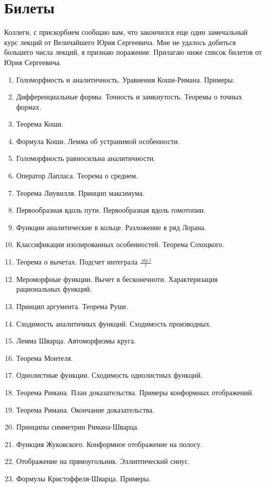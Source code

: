 \documentclass[12pt,a4paper]{article} %
\begin{document}
	\section{Билеты}
	Коллеги, с прискорбием сообщаю вам, что закончился еще один замечальный курс лекций от Величайшего Юрия Сергеевича. Мне не удалось добиться большего числа лекций, я признаю поражение. Прилагаю ниже список билетов от Юрия Сергеевича.
	\begin{enumerate}
		\item Голоморфность и аналитичность. Уравнения Коши-Римана. Примеры.
		\item Дифференциальные формы. Точность и замкнутость. Теоремы о точных формах.
		\item Теорема Коши.
		\item Формула Коши. Лемма об устранимой особенности.
		\item Голоморфность равносильна аналитичности.
		\item Оператор Лапласа. Теорема о среднем.
		\item Теорема Лиувилля. Принцип максимума.
		\item Первообразная вдоль пути. Первообразная вдоль гомотопии.
		\item Функции аналитические в кольце. Разложение в ряд Лорана.
		\item Классификация изолированных особенностей. Теорема Сохоцкого.
		\item Теорема о вычетах. Подсчет интеграла $\frac{\sin t}{t}$
		\item Мероморфные функции. Вычет в бесконечноти. Характеризация рациональных функций.
		\item Принцип аргумента. Теорема Руше.
		\item Сходимость аналитичных функций. Сходимость производных.
		\item Лемма Шварца. Автоморфизмы круга.
		\item Теорема Монтеля.
		\item Однолистные функции. Сходимость однолистных функций.
		\item Теорема Римана. План доказательства. Примеры конформных отображений.
		\item Теорема Римана. Окончание доказательства.
		\item Принципы симметрии Римана-Шварца.
		\item Функция Жуковского. Конформное отображение на полосу.
		\item Отображение на прямоугольник. Эллиптический синус.
		\item Формулы Кристоффеля-Шварца. Примеры.

\end{enumerate}
\end{document}
